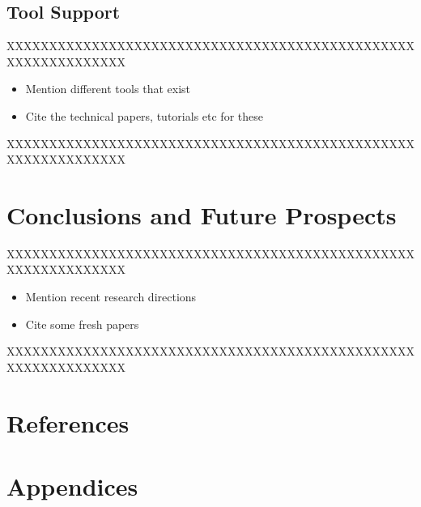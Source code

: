 \documentclass[12pt,a4paper]{article}
\begin{document}
\subsection{Tool Support}

XXXXXXXXXXXXXXXXXXXXXXXXXXXXXXXXXXXXXXXXXXXXXXXXXXXXXXXXXXXXXX

\begin{itemize}
\item Mention different tools that exist
\item Cite the technical papers, tutorials etc for these
\end{itemize}

XXXXXXXXXXXXXXXXXXXXXXXXXXXXXXXXXXXXXXXXXXXXXXXXXXXXXXXXXXXXXX

\section{Conclusions and Future Prospects}

XXXXXXXXXXXXXXXXXXXXXXXXXXXXXXXXXXXXXXXXXXXXXXXXXXXXXXXXXXXXXX

\begin{itemize}
\item Mention recent research directions
\item Cite some fresh papers
\end{itemize}

XXXXXXXXXXXXXXXXXXXXXXXXXXXXXXXXXXXXXXXXXXXXXXXXXXXXXXXXXXXXXX


\section{References}

\printbibliography

\section{Appendices}
\end{document}
